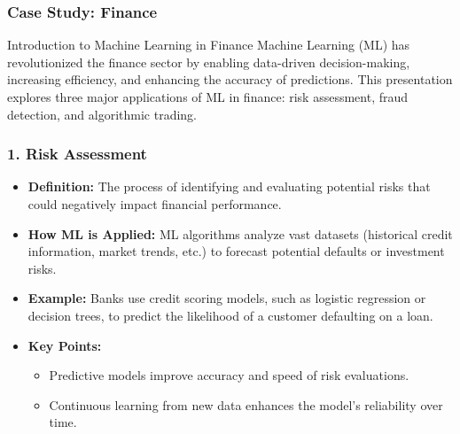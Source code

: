 \documentclass{beamer}
\begin{document}
\begin{frame}[fragile]
    \frametitle{Case Study: Finance}
    \begin{block}{Introduction to Machine Learning in Finance}
        Machine Learning (ML) has revolutionized the finance sector by enabling data-driven decision-making, increasing efficiency, and enhancing the accuracy of predictions. This presentation explores three major applications of ML in finance: risk assessment, fraud detection, and algorithmic trading.
    \end{block}
\end{frame}

\begin{frame}[fragile]
    \frametitle{1. Risk Assessment}
    \begin{itemize}
        \item \textbf{Definition:} The process of identifying and evaluating potential risks that could negatively impact financial performance.
        
        \item \textbf{How ML is Applied:} 
        ML algorithms analyze vast datasets (historical credit information, market trends, etc.) to forecast potential defaults or investment risks.
        
        \item \textbf{Example:} Banks use credit scoring models, such as logistic regression or decision trees, to predict the likelihood of a customer defaulting on a loan.
        
        \item \textbf{Key Points:}
        \begin{itemize}
            \item Predictive models improve accuracy and speed of risk evaluations.
            \item Continuous learning from new data enhances the model’s reliability over time.
        \end{itemize}
    \end{itemize}
\end{frame}
\end{document}

